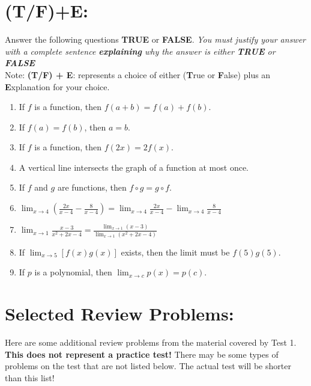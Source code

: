 \section*{(T/F)+E: }
Answer the following questions \textbf{TRUE} or \textbf{FALSE}.  \emph{You must justify your answer with a complete sentence \textbf{explaining} why the answer is either \textbf{TRUE} or \textbf{FALSE} }\\
Note: \textbf{(T/F) + E}: represents a choice of either (\textbf{T}rue or \textbf{F}alse) plus an \textbf{E}xplanation for your choice.

\begin{enumerate}
\item If \(f\) is a function, then \(f(a+b) = f(a)+f(b)\).
\item If \(f(a) = f(b)\), then \(a=b\).
\item If \(f\) is a function, then \(f(2x) = 2f(x)\).
\item A vertical line intersects the graph of a function at most once.
\item If \(f\) and \(g\) are functions, then \(f \circ g = g \circ f\).
\item \(\displaystyle \lim_{x\rightarrow 4} \left( \frac{2x}{x-4} - \frac{8}{x-4}\right) =   \lim_{x\rightarrow 4}  \frac{2x}{x-4} - \lim_{x\rightarrow 4} \frac{8}{x-4}\)
\item \(\displaystyle \lim_{x\rightarrow 1}  \frac{x-3}{x^2+2x-4}  =  \frac{ \displaystyle \lim_{x\rightarrow 1}(x-3)}{ \displaystyle \lim_{x\rightarrow 1}(x^2+2x-4)} \)
\item If \(\displaystyle \lim_{x\rightarrow 5} [ f(x) g(x)]\) exists, then the limit must be \(f(5) g(5)\).
\item If \(p\) is a polynomial, then   \(\displaystyle \lim_{x\rightarrow c} p(x) = p(c)\).
\end{enumerate}

\section*{Selected Review Problems:}
Here are some additional review problems from the material covered by Test 1.  \textbf{This does not represent a practice test!} There may be some types of problems on the test that are not listed below. The actual test will  be shorter than this list!



